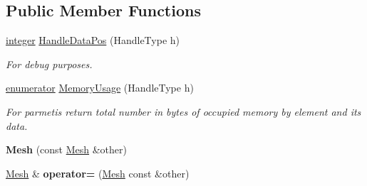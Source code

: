 \subsection*{Public Member Functions}
\begin{DoxyCompactItemize}
\item 
\hypertarget{classINMOST_1_1Mesh_a99d2f7410acff5bc75b0184890d7decd}{\hyperlink{classINMOST_1_1Storage_aec96942bc647417a801e2895b45964d2}{integer} \hyperlink{classINMOST_1_1Mesh_a99d2f7410acff5bc75b0184890d7decd}{Handle\-Data\-Pos} (Handle\-Type h)}\label{classINMOST_1_1Mesh_a99d2f7410acff5bc75b0184890d7decd}

\begin{DoxyCompactList}\small\item\em For debug purposes. \end{DoxyCompactList}\item 
\hypertarget{classINMOST_1_1Mesh_ab2d7cbbd5950153b3c16e26f1bd50c3d}{\hyperlink{classINMOST_1_1Storage_ae333dfced6fa9cfde0c8e7dcf1b0cc2b}{enumerator} \hyperlink{classINMOST_1_1Mesh_ab2d7cbbd5950153b3c16e26f1bd50c3d}{Memory\-Usage} (Handle\-Type h)}\label{classINMOST_1_1Mesh_ab2d7cbbd5950153b3c16e26f1bd50c3d}

\begin{DoxyCompactList}\small\item\em For parmetis return total number in bytes of occupied memory by element and its data. \end{DoxyCompactList}\item 
\hypertarget{classINMOST_1_1Mesh_aef026100f4ec3b0165a5816558faadc2}{{\bfseries Mesh} (const \hyperlink{classINMOST_1_1Mesh}{Mesh} \&other)}\label{classINMOST_1_1Mesh_aef026100f4ec3b0165a5816558faadc2}

\item 
\hypertarget{classINMOST_1_1Mesh_a83cc916a08f462721b5986abf71005ea}{\hyperlink{classINMOST_1_1Mesh}{Mesh} \& {\bfseries operator=} (\hyperlink{classINMOST_1_1Mesh}{Mesh} const \&other)}\label{classINMOST_1_1Mesh_a83cc916a08f462721b5986abf71005ea}


\end{DoxyCompactItemize}
